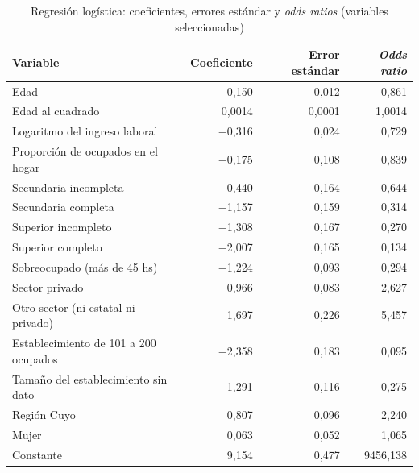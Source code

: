 \begin{table}[H]
\caption{Regresión logística: coeficientes, errores estándar y \textit{odds ratios} (variables seleccionadas)}
\label{tab:logit_resumen}
\centering
\footnotesize
\begin{tabular}{lrrr}
\toprule
Variable & Coeficiente & Error estándar & \textit{Odds ratio} \\
\midrule
Edad & $-$0,150 & 0,012 & 0,861 \\
Edad al cuadrado & 0,0014 & 0,0001 & 1,0014 \\
Logaritmo del ingreso laboral & $-$0,316 & 0,024 & 0,729 \\
Proporción de ocupados en el hogar & $-$0,175 & 0,108 & 0,839 \\
Secundaria incompleta & $-$0,440 & 0,164 & 0,644 \\
Secundaria completa & $-$1,157 & 0,159 & 0,314 \\
Superior incompleto & $-$1,308 & 0,167 & 0,270 \\
Superior completo & $-$2,007 & 0,165 & 0,134 \\
Sobreocupado (más de 45 hs) & $-$1,224 & 0,093 & 0,294 \\
Sector privado & 0,966 & 0,083 & 2,627 \\
Otro sector (ni estatal ni privado) & 1,697 & 0,226 & 5,457 \\
Establecimiento de 101 a 200 ocupados & $-$2,358 & 0,183 & 0,095 \\
Tamaño del establecimiento sin dato & $-$1,291 & 0,116 & 0,275 \\
Región Cuyo & 0,807 & 0,096 & 2,240 \\
Mujer & 0,063 & 0,052 & 1,065 \\
Constante & 9,154 & 0,477 & 9456,138 \\
\bottomrule
\end{tabular}
\end{table}
